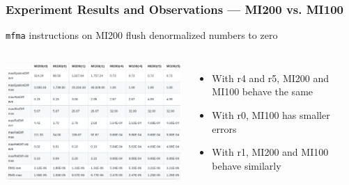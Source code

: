 \documentclass[t, pdftex, aspectratio=169]{beamer}  %
\begin{document}
\begin{frame}
  \frametitle{Experiment Results and Observations --- MI200 vs. MI100}

  \texttt{mfma} instructions on MI200 flush denormalized numbers to zero
  
  \begin{columns}
    
    \includegraphics[width=4in]{MI200_MI100}
    

    \begin{itemize}
    \item With r4 and r5, MI200 and MI100 behave the same
    \item With r0, MI100 has smaller errors
    \item With r1, MI200 and MI100 behave similarly
    \end{itemize}
  \end{columns}
  
\end{frame}
\end{document}
